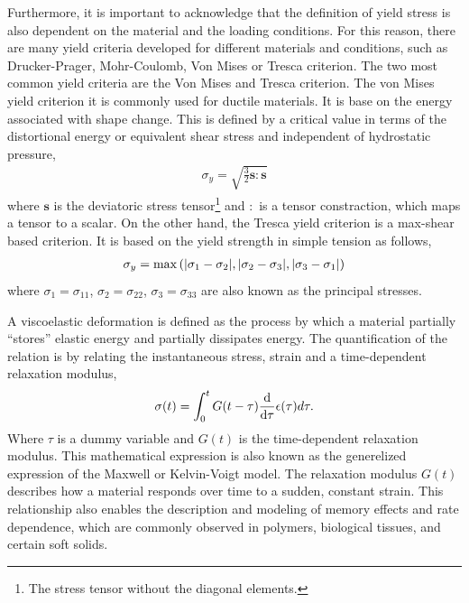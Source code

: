 Furthermore, it is important to acknowledge that the definition of yield stress is also dependent on the material and the loading conditions\citep{bonnYieldStressMaterials2017}.
For this reason, there are many yield criteria developed for different materials and conditions, such as Drucker-Prager, Mohr-Coulomb, Von Mises or Tresca criterion.
The two most common yield criteria are the Von Mises and Tresca criterion.
The von Mises yield criterion it is commonly used for ductile materials.
It is base on the energy associated with shape change. 
This is defined by a critical value in terms of the distortional energy or equivalent shear stress and independent of hydrostatic pressure, 
\begin{gather}
    \sigma_y = \sqrt{\frac{3}{2}\bm{s}:\bm{s}}\label{eqn:vonMisesCriterion}
\end{gather}
where $\bm{s}$ is the deviatoric stress tensor\footnote{The stress tensor without the diagonal elements.} and $:$ is a tensor constraction, which maps a tensor to a scalar.
On the other hand, the Tresca yield criterion is a max-shear based criterion.
It is based on the yield strength in simple tension as follows, 
\begin{gather}
   \sigma_y = \max\left(\abs{\sigma_1-\sigma_2},\abs{\sigma_2-\sigma_3},\abs{\sigma_3-\sigma_1}\right)\label{eqn:trescaCriterion}
\end{gather}
where $\sigma_1=\sigma_{11}$, $\sigma_2=\sigma_{22}$, $\sigma_3=\sigma_{33}$ are also known as the principal stresses.

A viscoelastic deformation is defined as the process by which a material partially ``stores'' elastic energy and partially dissipates energy.
The quantification of the relation is by relating the instantaneous stress, strain and a time-dependent relaxation modulus,
\begin{gather}
    \sigma(t) = \int_0^t G(t-\tau)\dv{\tau}\epsilon(\tau)d\tau\label{eqn:viscoelastiEQN}.
\end{gather}
Where $\tau$ is a dummy variable and $G(t)$ is the time-dependent relaxation modulus.
This mathematical expression is also known as the generelized expression of the Maxwell or Kelvin-Voigt model.
The relaxation modulus $G(t)$ describes how a material responds over time to a sudden, constant strain.
This relationship also enables the description and modeling of memory effects and rate dependence, which are commonly observed in polymers, biological tissues, and certain soft solids.

